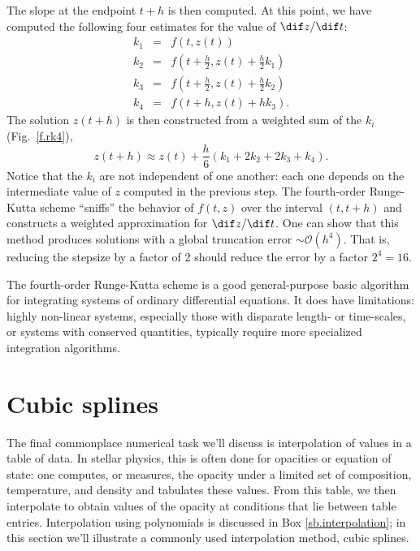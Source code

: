 The slope at the endpoint $t+h$ is then computed. At this point, we have computed the following four estimates for the value of $\dif z/\dif t$:
\begin{eqnarray}
k_{1} &=& f(t,z(t)) \\
k_{2} &=& f\left(t+\frac{h}{2}, z(t) + \frac{h}{2}k_{1}\right)\\
k_{3} &=& f\left(t+\frac{h}{2},z(t) + \frac{h}{2}k_{2}\right)\\
k_{4} &=& f\left(t + h, z(t) + hk_{3}\right).
\end{eqnarray}
The solution $z(t+h)$ is then constructed from a weighted sum of the $k_{i}$ (Fig.~\ref{f.rk4}),
\begin{equation}\label{e.rk4}
	z(t+h) \approx z(t) + \frac{h}{6}\left(k_{1} + 2k_{2} + 2k_{3} + k_{4}\right).
\end{equation}
Notice that the $k_{i}$ are not independent of one another: each one depends on the intermediate value of $z$ computed in the previous step. The fourth-order Runge-Kutta scheme ``sniffs'' the behavior of $f(t,z)$ over the interval $(t,t+h)$ and constructs a weighted approximation for $\dif z/\dif t$.  One can show that this method produces solutions with a global truncation error $\sim\mathcal{O}(h^{4})$. That is, reducing the stepsize by a factor of 2 should reduce the error by a factor $2^{4} = 16$.

The fourth-order Runge-Kutta scheme is a good general-purpose basic algorithm for integrating systems of ordinary differential equations. It does have limitations: highly non-linear systems, especially those with disparate length- or time-scales, or systems with conserved quantities, typically require more specialized integration algorithms.

\section{Cubic splines}
The final commonplace numerical task we'll discuss is interpolation of values in a table of data. In stellar physics, this is often done for opacities or equation of state: one computes, or measures, the opacity under a limited set of composition, temperature, and density and tabulates these values. From this table, we then interpolate to obtain values of the opacity at conditions that lie between table entries. Interpolation using polynomials is discussed in Box \ref{sb.interpolation}; in this section we'll illustrate a commonly used interpolation method, cubic splines.

